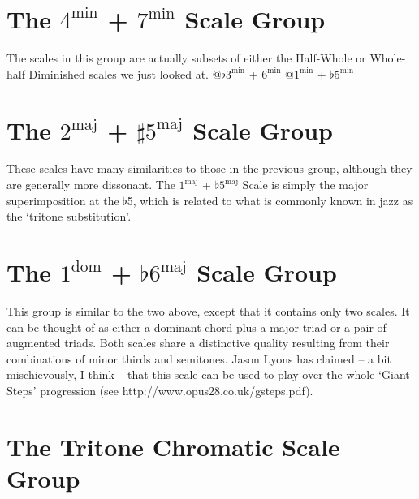 \documentclass[english]{./gbook}
\begin{document}
\begin{large}


\section{The $4^{\text{min}}$ + $7^{\text{min}}$ Scale Group}
The scales in this group are actually subsets of either the Half-Whole or Whole-half Diminished scales we just looked at.
@$\flat 3^{\text{min}}$ + $6^{\text{min}}$
@$1^{\text{min}}$ + $\flat 5^{\text{min}}$
%

\section{The $2^{\text{maj}}$ + $\sharp 5^{\text{maj}}$ Scale Group}
These scales have many similarities to those in the previous group, although they are generally more dissonant. The $1^{\text{maj}}$ + $\flat 5^{\text{maj}}$ Scale is simply the major superimposition at the $\flat$5, which is related to what is commonly known in jazz as the `tritone substitution'.



\section{The $1^{\text{dom}}$ + $\flat 6^{\text{maj}}$ Scale Group}

This group is similar to the two above, except that it contains only two scales. It can be thought of as either a dominant chord plus a major triad or a pair of augmented triads. Both scales share a distinctive quality resulting from their combinations of minor thirds and semitones. Jason Lyons has claimed -- a bit mischievously, I think -- that this scale can be used to play over the whole `Giant Steps' progression (see http://www.opus28.co.uk/gsteps.pdf).



\section{The Tritone Chromatic Scale Group}



\end{large}
\end{document}
